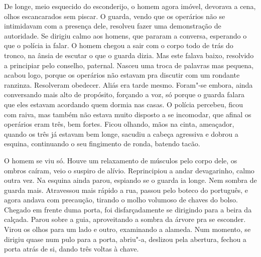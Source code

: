 De longe, meio esquecido do esconderijo, o homem agora imóvel, devorava
a cena, olhos escancarados sem piscar. O guarda, vendo que os operários
não se intimidavam com a presença dele, resolveu fazer uma demonstração
de autoridade. Se dirigiu calmo aos homens, que pararam a conversa,
esperando o que o polícia ia falar. O homem chegou a sair com o corpo
todo de trás do tronco, na ânsia de escutar o que o guarda dizia. Mas
este falava baixo, resolvido a principiar pelo conselho, paternal.
Nasceu uma troca de palavras mas pequena, acabou logo, porque os
operários não estavam pra discutir com um rondante ranzinza. Resolveram
obedecer. Aliás era tarde mesmo. Foram"-se embora, ainda conversando mais
alto de propósito, forçando a voz, só porque o guarda falara que eles
estavam acordando quem dormia nas casas. O polícia percebeu, ficou com
raiva, mas também não estava muito disposto a se incomodar, que afinal
os operários eram três, bem fortes. Ficou olhando, mãos na cinta,
ameaçador, quando os três já estavam bem longe, sacudiu a cabeça
agressiva e dobrou a esquina, continuando o seu fingimento de ronda,
batendo tacão.

O homem se viu só. Houve um relaxamento de músculos pelo corpo dele, os
ombros caíram, veio o suspiro de alívio. Reprincipiou a andar
devagarinho, calmo outra vez. Na esquina ainda parou, espiando se o
guarda ia longe. Nem sombra de guarda mais. Atravessou mais rápido a
rua, passou pelo boteco do português, e agora andava com precaução,
tirando o molho volumoso de chaves do bolso. Chegado em frente duma
porta, foi disfarçadamente se dirigindo para a beira da calçada. Parou
sobre a guia, aproveitando a sombra da árvore pra se esconder. Virou os
olhos para um lado e outro, examinando a alameda. Num momento, se
dirigiu quase num pulo para a porta, abriu"-a, deslizou pela abertura,
fechou a porta atrás de si, dando três voltas à chave.
